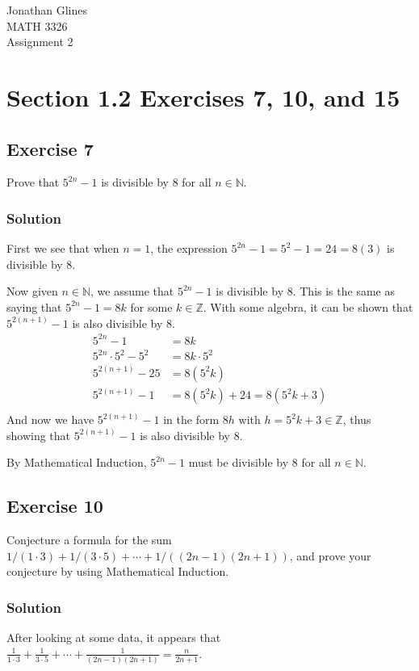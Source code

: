 \documentclass[12pt]{article}
\begin{document}
\begin{flushright}
{\Large
Jonathan Glines \\
MATH 3326 \\
Assignment 2 \\
}
\end{flushright}
\section*{Section 1.2 Exercises 7, 10, and 15}
\subsection*{Exercise 7}
Prove that $5^{2n} - 1$ is divisible by 8 for all $n \in \mathbb{N}$.
\subsubsection*{Solution}
First we see that when $n = 1$, the expression $5^{2n} - 1 = 5^2 - 1 = 24 = 8(3)$ is divisible by 8.

Now given $n \in \mathbb{N}$, we assume that $5^{2n} - 1$ is divisible by 8. This is the same as saying that $5^{2n} - 1 = 8k$ for some $k \in \mathbb{Z}$. With some algebra, it can be shown that $5^{2\left(n + 1\right)} - 1$ is also divisible by 8.
\begin{align*}
5^{2n} - 1 &= 8k \\
5^{2n} \cdot 5^2 - 5^2 &= 8k \cdot 5^2 \\
5^{2\left(n + 1\right)} - 25 &= 8\left(5^2 k\right) \\
5^{2\left(n + 1\right)} - 1 &= 8\left(5^2 k\right) + 24 = 8\left(5^2 k + 3\right) \\
\end{align*}
And now we have $5^{2\left(n + 1\right)} - 1$ in the form $8h$ with $h = 5^2 k + 3 \in \mathbb{Z}$, thus showing that $5^{2\left(n + 1\right)} - 1$ is also divisible by 8.

By Mathematical Induction, $5^{2n} - 1$ must be divisible by 8 for all $n \in \mathbb{N}$.

\subsection*{Exercise 10}
Conjecture a formula for the sum $1/\left(1\cdot 3\right) + 1/\left(3 \cdot 5\right) + \cdots + 1 /\left(\left(2n - 1\right)\left(2n+1\right)\right)$, and prove your conjecture by using Mathematical Induction.
\subsubsection*{Solution}
After looking at some data, it appears that $\frac{1}{1 \cdot 3} + \frac{1}{3 \cdot 5} + \cdots + \frac{1}{\left(2n - 1\right)\left(2n + 1\right)} = \frac{n}{2n + 1}$.
\end{document}
